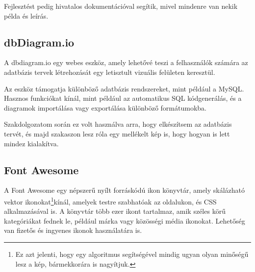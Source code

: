 \documentclass[
]{thesis-ekf}
\theoremstyle{definition}
\theoremstyle{remark}
\begin{document}
	Fejlesztést pedig hivatalos dokumentációval segítik, mivel mindenre van nekik példa és leírás.\cite{tailwind-docs}
	
	
	\subsection{dbDiagram.io}
	A dbdiagram.io egy webes eszköz, amely lehetővé teszi a felhasználók számára az adatbázis tervek létrehozását egy letisztult vizuális felületen keresztül. 
	
	Az eszköz támogatja különböző adatbázis rendszereket, mint például a MySQL. Hasznos funkciókat kínál, mint például az automatikus SQL kódgenerálás, és a diagramok importálása vagy exportálása különböző formátumokba.\cite{dbdiagram-io}
	
	Szakdolgozatom során ez volt használva arra, hogy elkészítsem az adatbázis tervét, és majd  szakaszon lesz róla egy mellékelt kép is, hogy hogyan is lett mindez kialakítva.
	
	\subsection{Font Awesome}
	A Font Awesome egy népszerű nyílt forráskódú ikon könyvtár, amely skálázható vektor ikonokat\footnote{Ez azt jelenti, hogy egy algoritmus segítségével mindig ugyan olyan minőségű lesz a kép, bármekkorára is nagyítjuk.}kínál, amelyek testre szabhatóak az oldalukon, és CSS alkalmazásával is. A könyvtár több ezer ikont tartalmaz, amik széles körű kategóriákat fednek le, például márka vagy közösségi média ikonokat. Lehetőség van fizetős és ingyenes ikonok használatára is.
	
\end{document}
